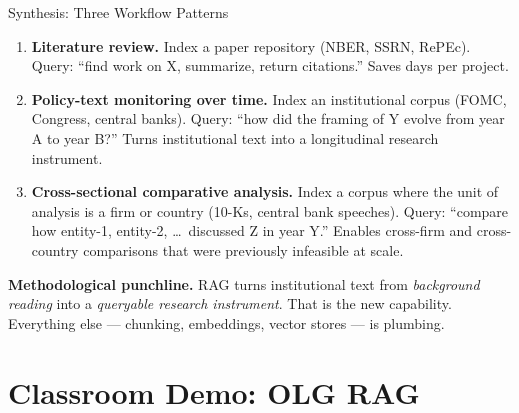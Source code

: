 \begin{frame}{Synthesis: Three Workflow Patterns}
\begin{enumerate}
\item \textbf{Literature review.} Index a paper repository (NBER, SSRN, RePEc). Query: ``find work on X, summarize, return citations.'' Saves days per project.

\medskip
\item \textbf{Policy-text monitoring over time.} Index an institutional corpus (FOMC, Congress, central banks). Query: ``how did the framing of Y evolve from year A to year B?'' Turns institutional text into a longitudinal research instrument.

\medskip
\item \textbf{Cross-sectional comparative analysis.} Index a corpus where the unit of analysis is a firm or country (10-Ks, central bank speeches). Query: ``compare how entity-1, entity-2, \dots\ discussed Z in year Y.'' Enables cross-firm and cross-country comparisons that were previously infeasible at scale.
\end{enumerate}

\bigskip
\textbf{Methodological punchline.} RAG turns institutional text from \emph{background reading} into a \emph{queryable research instrument}. That is the new capability. Everything else --- chunking, embeddings, vector stores --- is plumbing.
\end{frame}


\section{Classroom Demo: OLG RAG}

